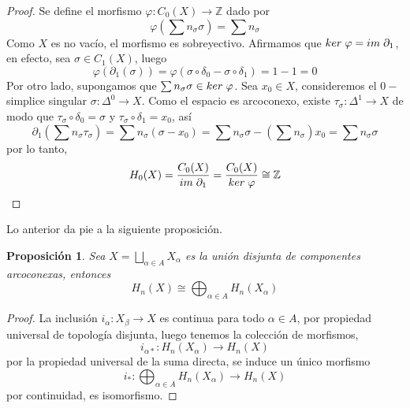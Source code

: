 \documentclass[aop]{imsart2}
\theoremstyle{plain}
\newtheorem{prop}[teo]{Proposición}
\theoremstyle{remark}
\newcommand{\im}[1]{im\hspace{1mm}#1}
\newcommand{\kr}[1]{ker\hspace{1mm}#1}
\def \Z {\mathbb{Z}}
\begin{document}
\begin{proof}
    Se define el morfismo $\varphi:C_{0}(X)\to\Z$ dado por
    \begin{equation*}
        \varphi\left(\sum n_{\sigma}\sigma\right)=\sum n_{\sigma}
    \end{equation*}
    Como $X$ es no vacío, el morfismo es sobreyectivo. Afirmamos que 
    $\kr{\varphi}=\im{\partial_{1}}$, en efecto, sea $\sigma\in C_{1}(X)$, luego
    \begin{equation*}
        \varphi(\partial_{1}(\sigma))=\varphi(\sigma\circ\delta_{0}-\sigma\circ\delta_{1})=1-1=0
    \end{equation*}
    Por otro lado, supongamos que $\sum n_{\sigma}\sigma\in\kr{\varphi}$. Sea $x_{0}\in X$, 
    consideremos el $0-$simplice singular $\sigma:\Delta^{0}\to X$. Como el espacio es arcoconexo, 
    existe $\tau_{\sigma}:\Delta^{1}\to X$ de modo que $\tau_{\sigma}\circ\delta_{0}=\sigma$ y
    $\tau_{\sigma}\circ\delta_{1}=x_{0}$, así
    \begin{equation*}
        \partial_{1}\left(\sum n_{\sigma}\tau_{\sigma}\right)=\sum n_{\sigma}(\sigma-x_{0})
        =\sum n_{\sigma}\sigma-\left(\sum n_{\sigma}\right)x_{0}=\sum n_{\sigma}\sigma
    \end{equation*}
    por lo tanto,
    \begin{equation*}
        H_{0}(X)=\frac{C_{0}(X)}{\im{\partial_{1}}}=\frac{C_{0}(X)}{\kr{\varphi}}\cong\Z
    \end{equation*}
\end{proof}

\noindent Lo anterior da pie a la siguiente proposición.

\begin{prop}
    Sea $X=\bigsqcup_{\alpha\in A}X_{\alpha}$ es la unión disjunta de componentes arcoconexas,
    entonces
    \begin{equation*}
        H_{n}(X)\cong\bigoplus_{\alpha\in A}H_{n}(X_{\alpha})
    \end{equation*}
\end{prop}

\begin{proof}
    La inclusión $i_{\alpha}:X_{\beta}\to X$ es continua para todo $\alpha\in A$, por propiedad 
    universal de topología disjunta, luego tenemos la colección de morfismos, 
    \begin{equation*}
        i_{\alpha*}:H_{n}(X_{\alpha})\to H_{n}(X)
    \end{equation*}
    por la propiedad universal de la suma directa, se induce un único morfismo 
    \begin{equation*}
        i_{*}:\bigoplus_{\alpha\in A}H_{n}(X_{\alpha})\to H_{n}(X)
    \end{equation*}
    por continuidad, es isomorfismo.
\end{proof}
\end{document}
